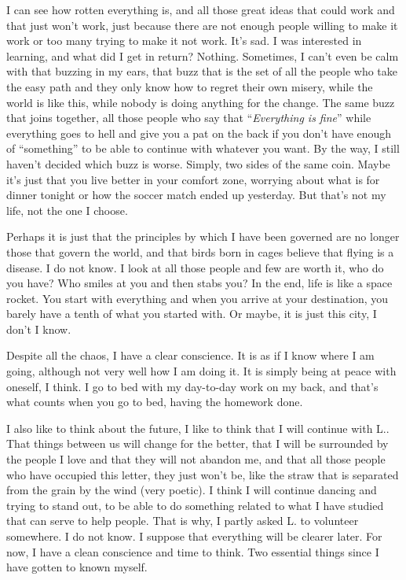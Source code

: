 \documentclass[]{book}
\begin{document}
I can see how rotten everything is, and all those great ideas that could work and that just won't work, just because there are not enough people willing to make it work or too many trying to make it not work. It's sad. I was interested in learning, and what did I get in return? Nothing. Sometimes, I can't even be calm with that buzzing in my ears, that buzz that is the set of all the people who take the easy path and they only know how to regret their own misery, while the world is like this, while nobody is doing anything for the change. The same buzz that joins together, all those people who say that ``\emph{Everything is fine}'' while everything goes to hell and give you a pat on the back if you don't have enough of ``something'' to be able to continue with whatever you want. By the way, I still haven't decided which buzz is worse. Simply, two sides of the same coin. Maybe it's just that you live better in your comfort zone, worrying about what is for dinner tonight or how the soccer match ended up yesterday. But that's not my life, not the one I choose.

Perhaps it is just that the principles by which I have been governed are no longer those that govern the world, and that birds born in cages believe that flying is a disease. I do not know. I look at all those people and few are worth it, who do you have? Who smiles at you and then stabs you? In the end, life is like a space rocket. You start with everything and when you arrive at your destination, you barely have a tenth of what you started with. Or maybe, it is just this city, I don't I know.

Despite all the chaos, I have a clear conscience. It is as if I know where I am going, although not very well how I am doing it. It is simply being at peace with oneself, I think. I go to bed with my day-to-day work on my back, and that's what counts when you go to bed, having the homework done.

I also like to think about the future, I like to think that I will continue with L.. That things between us will change for the better, that I will be surrounded by the people I love and that they will not abandon me, and that all those people who have occupied this letter, they just won't be, like the straw that is separated from the grain by the wind (very poetic). I think I will continue dancing and trying to stand out, to be able to do something related to what I have studied that can serve to help people. That is why, I partly asked L. to volunteer somewhere. I do not know. I suppose that everything will be clearer later. For now, I have a clean conscience and time to think. Two essential things since I have gotten to known myself.
\end{document}
